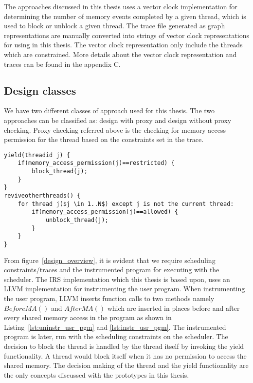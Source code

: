 The approaches discussed in this thesis uses a vector clock implementation for determining the number of memory events completed by a given thread, which is used to block or unblock a given thread. 
The trace file generated as graph representations are manually converted into strings of vector clock representations for using in this thesis. 
The vector clock representation only include the threads which are constrained. 
More details about the vector clock representation and traces can be found in the appendix C.


\subsection{Design classes}

We have two different classes of approach used for this thesis. 
The two approaches can be classified as: design with proxy and design without proxy checking. 
Proxy checking referred above is the checking for memory  access permission for the thread based on the constraints set in the trace. 

\begin{lstlisting}[mathescape=true,style=customc,caption={Yield functionality and thread revival},frame=tlrb,label={lst:yield_func}]
yield(threadid j) {
	if(memory_access_permission(j)==restricted) {
		block_thread(j);
	}
}
reviveotherthreads() {
	for thread j($j \in 1..N$) except j is not the current thread:
		if(memory_access_permission(j)==allowed) {
			unblock_thread(j);
		}	
	}
}
\end{lstlisting}
From figure~\ref{design_overview}, it is evident that we require scheduling constraints/traces and the instrumented program for executing with the scheduler. 
The IRS implementation which this thesis is based upon, uses an LLVM implementation for instrumenting the user program. 
When instrumenting the user program, LLVM inserts function calls to two methods namely $BeforeMA()$ and $AfterMA()$ which are inserted in places before and after every shared memory access in the program as shown in Listing~\ref{lst:uninstr_usr_pgm} and \ref{lst:instr_usr_pgm}. 
The instrumented program is later, run with the scheduling constraints on the scheduler. 
The decision to block the thread is handled by the thread itself by invoking the yield functionality. 
A thread would block itself when it has no permission to access the shared memory. 
The decision making of the thread and the yield functionality are the only concepts discussed with the prototypes in this thesis. 

